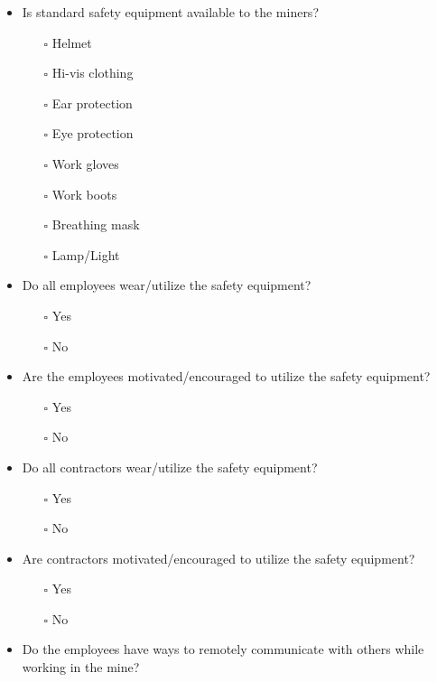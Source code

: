 \documentclass[
  12pt,
]{scrbook}
\providecommand{\tightlist}{%
  \setlength{\itemsep}{0pt}\setlength{\parskip}{0pt}}
\begin{document}
\begin{itemize}
\item
  Is standard safety equipment available to the miners?

  \begin{itemize}
  \tightlist
  \item[$\square$]
    Helmet
  \item[$\square$]
    Hi-vis clothing
  \item[$\square$]
    Ear protection
  \item[$\square$]
    Eye protection
  \item[$\square$]
    Work gloves
  \item[$\square$]
    Work boots
  \item[$\square$]
    Breathing mask
  \item[$\square$]
    Lamp/Light
  \end{itemize}
\item
  Do all employees wear/utilize the safety equipment?

  \begin{itemize}
  \tightlist
  \item[$\square$]
    Yes
  \item[$\square$]
    No
  \end{itemize}
\item
  Are the employees motivated/encouraged to utilize the safety equipment?

  \begin{itemize}
  \tightlist
  \item[$\square$]
    Yes
  \item[$\square$]
    No
  \end{itemize}
\item
  Do all contractors wear/utilize the safety equipment?

  \begin{itemize}
  \tightlist
  \item[$\square$]
    Yes
  \item[$\square$]
    No
  \end{itemize}
\item
  Are contractors motivated/encouraged to utilize the safety equipment?

  \begin{itemize}
  \tightlist
  \item[$\square$]
    Yes
  \item[$\square$]
    No
  \end{itemize}
\item
  Do the employees have ways to remotely communicate with others while working in the mine?


\end{itemize}
\end{document}
